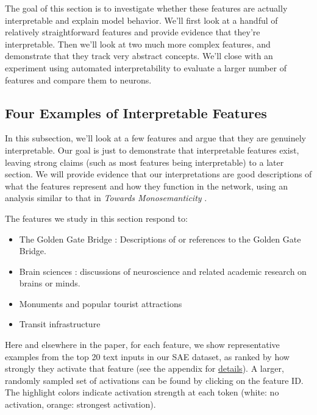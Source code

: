 \documentclass{article}
\let\oldsubsection\subsection
\renewcommand{\subsection}{\FloatBarrier\oldsubsection}
\newcommand{\featurechip}[2]{%
  \href{https://transformer-circuits.pub/2024/scaling-monosemanticity/features/index.html?featureId=#1_#2}{%
    \featurechipbox{\textcolor{white}{\textsf{\footnotesize #1/#2}}}%
  }%
}
\begin{document}
The goal of this section is to investigate whether these features are actually interpretable and explain model behavior. We'll first look at a handful of relatively straightforward features and provide evidence that they're interpretable. Then we'll look at two much more complex features, and demonstrate that they track very abstract concepts. We'll close with an experiment using automated interpretability to evaluate a larger number of features and compare them to neurons.

\subsection{Four Examples of Interpretable Features}\label{sec:assessing-tour}

In this subsection, we'll look at a few features and argue that they are genuinely interpretable. Our goal is just to demonstrate that interpretable features exist, leaving strong claims (such as most features being interpretable) to a later section.  We will provide evidence that our interpretations are good descriptions of what the features represent and how they function in the network, using an analysis similar to that in \textit{Towards Monosemanticity }\cite{bricken2023monosemanticity}.

The features we study in this section respond to:

\begin{itemize}
    \item The Golden Gate Bridge \featurechip{34M}{31164353}: Descriptions of or references to the Golden Gate Bridge.
    \item Brain sciences \featurechip{34M}{9493533}: discussions of neuroscience and related academic research on brains or minds.
    \item Monuments and popular tourist attractions \featurechip{1M}{887839}
    \item Transit infrastructure \featurechip{1M}{3}
\end{itemize}

Here and elsewhere in the paper, for each feature, we show representative examples from the top 20 text inputs in our SAE dataset, as ranked by how strongly they activate that feature (see the appendix for \hyperref[sec:appendix-methods-dataset]{details}). A larger, randomly sampled set of activations can be found by clicking on the feature ID. The highlight colors indicate activation strength at each token (white: no activation, orange: strongest activation).
\end{document}

